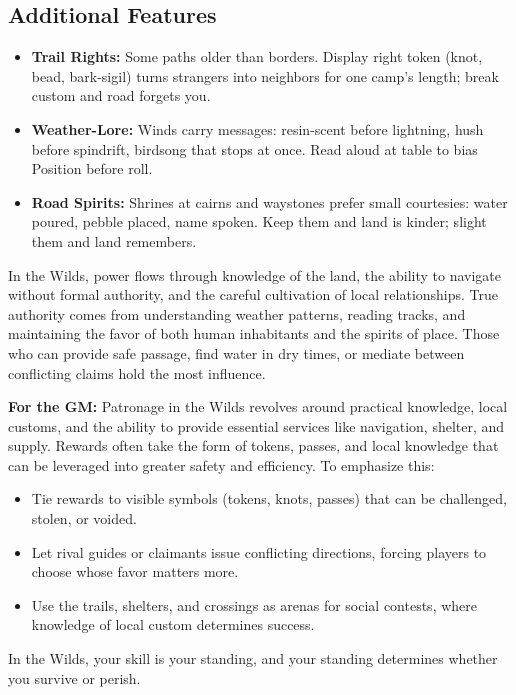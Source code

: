 \subsection*{Additional Features}
\begin{itemize}
\item \textbf{Trail Rights:} Some paths older than borders. Display right token (knot, bead, bark-sigil) turns strangers into neighbors for one camp's length; break custom and road forgets you.
\item \textbf{Weather-Lore:} Winds carry messages: resin-scent before lightning, hush before spindrift, birdsong that stops at once. Read aloud at table to bias Position before roll.
\item \textbf{Road Spirits:} Shrines at cairns and waystones prefer small courtesies: water poured, pebble placed, name spoken. Keep them and land is kinder; slight them and land remembers.
\end{itemize}

\begin{tcolorbox}[colback=black!3,colframe=black!40!white,title={Patronage \& Power}]
In the Wilds, power flows through knowledge of the land, the ability to navigate without formal authority, and the careful cultivation of local relationships. True authority comes from understanding weather patterns, reading tracks, and maintaining the favor of both human inhabitants and the spirits of place. Those who can provide safe passage, find water in dry times, or mediate between conflicting claims hold the most influence.

\textbf{For the GM:}  
Patronage in the Wilds revolves around practical knowledge, local customs, and the ability to provide essential services like navigation, shelter, and supply. Rewards often take the form of tokens, passes, and local knowledge that can be leveraged into greater safety and efficiency. To emphasize this:
\begin{itemize}
\item Tie rewards to visible symbols (tokens, knots, passes) that can be challenged, stolen, or voided.
\item Let rival guides or claimants issue conflicting directions, forcing players to choose whose favor matters more.
\item Use the trails, shelters, and crossings as arenas for social contests, where knowledge of local custom determines success.
\end{itemize}
In the Wilds, your skill is your standing, and your standing determines whether you survive or perish.
\end{tcolorbox}

